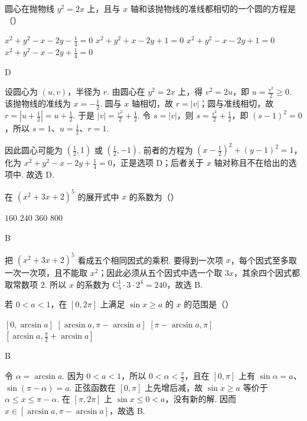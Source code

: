 \begin{problem}
圆心在抛物线 \(y^2=2x\) 上，且与 \(x\) 轴和该抛物线的准线都相切的一个圆的方程是（\quad）

\choices
    {\(x^2+y^2-x-2y-\frac{1}{4}=0\)}
    {\(x^2+y^2+x-2y+1=0\)}
    {\(x^2+y^2-x-2y+1=0\)}
    {\(x^2+y^2-x-2y+\frac{1}{4}=0\)}

\begin{answer}
D
\end{answer}

\begin{solution}
设圆心为 \((u,v)\)，半径为 \(r\). 由圆心在 \(y^2=2x\) 上，得 \(v^2=2u\)，即 \(u=\frac{v^2}{2}\geqslant0\). 该抛物线的准线为 \(x=-\frac12\). 圆与 \(x\) 轴相切，故 \(r=|v|\)；圆与准线相切，故
\(r=\left|u+\frac12\right|=u+\frac12\). 于是
\( |v|=\frac{v^2}{2}+\frac12\). 令 \(s=|v|\)，则 \(s=\frac{s^2}{2}+\frac12\)，即 \((s-1)^2=0\)，所以 \(s=1\)、\(u=\frac12\)、\(r=1\).

因此圆心可能为 \(\left(\frac12,1\right)\) 或 \(\left(\frac12,-1\right)\). 前者的方程为
\(\left(x-\frac12\right)^2+(y-1)^2=1\)，化为 \(x^2+y^2-x-2y+\frac14=0\)，正是选项 D；后者关于 \(x\) 轴对称且不在给出的选项中. 故选 D.
\end{solution}
\end{problem}

\begin{problem}
在 \((x^2+3x+2)^5\) 的展开式中 \(x\) 的系数为（\quad）

\choices
    {\(160\)}
    {\(240\)}
    {\(360\)}
    {\(800\)}

\begin{answer}
B
\end{answer}

\begin{solution}
把 \((x^2+3x+2)^5\) 看成五个相同因式的乘积. 要得到一次项 \(x\)，每个因式至多取一次一次项，且不能取 \(x^2\)；因此必须从五个因式中选一个取 \(3x\)，其余四个因式都取常数项 \(2\). 所以 \(x\) 的系数为
\(\mathrm C_5^1\cdot3\cdot2^4=240\)，故选 B.
\end{solution}
\end{problem}

\begin{problem}
若 \(0<a<1\)，在 \([0,2\pi]\) 上满足 \(\sin x\geqslant a\) 的 \(x\) 的范围是（\quad）

\choices
    {\([0,\arcsin a]\)}
    {\([\arcsin a,\pi-\arcsin a]\)}
    {\([\pi-\arcsin a,\pi]\)}
    {\(\left[\arcsin a,\frac{\pi}{2}+\arcsin a\right]\)}

\begin{answer}
B
\end{answer}

\begin{solution}
令 \(\alpha=\arcsin a\). 因为 \(0<a<1\)，所以 \(0<\alpha<\frac\pi2\)，且在 \([0,\pi]\) 上有 \(\sin\alpha=a\)、\(\sin(\pi-\alpha)=a\). 正弦函数在 \([0,\pi]\) 上先增后减，故 \(\sin x\geqslant a\) 等价于 \(\alpha\leqslant x\leqslant\pi-\alpha\). 在 \([\pi,2\pi]\) 上 \(\sin x\leqslant0<a\)，没有新的解. 因而 \(x\in[\arcsin a,\pi-\arcsin a]\)，故选 B.
\end{solution}
\end{problem}

